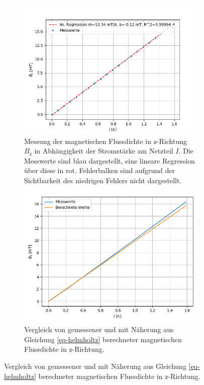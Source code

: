\documentclass[page,pdftex,12pt,a4paper,twoside,openright]{scrbook}
\begin{document}
\begin{figure}[h]
\begin{subfigure}[t]{0.5\textwidth}
\includegraphics[width=\textwidth]{img/B(I).png}
\caption{Messung der magnetischen Flussdichte in z-Richtung $B_\mathrm{z}$ in Abhängigkeit der Stromstärke am Netzteil $I$. Die Messwerte sind blau dargestellt, eine lineare Regression über diese in rot. Fehlerbalken sind aufgrund der Sichtbarkeit des niedrigen Fehlers nicht dargestellt.}
\label{fig-magnetfeldstrom}
\end{subfigure}%
\begin{subfigure}[t]{0.5\textwidth}
\includegraphics[width=\textwidth]{img/b_calc.png}
\caption{Vergleich von gemessener und mit Näherung aus Gleichung \ref{eq-helmholtz} berechneter magnetischen Flussdichte in z-Richtung.}
\label{fig-b_helmholtz}
\end{subfigure}
\end{figure}
\end{document}
